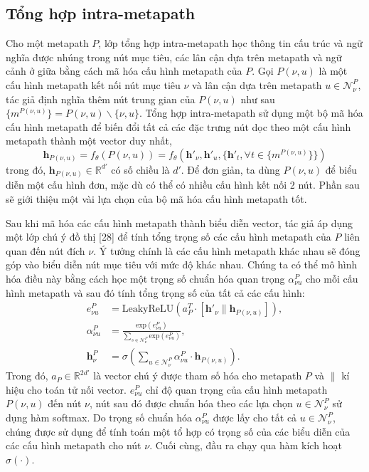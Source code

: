 \subsection{Tổng hợp intra-metapath}
Cho một metapath $P$, lớp tổng hợp intra-metapath học thông tin cấu trúc và ngữ nghĩa được nhúng trong nút mục tiêu, các lân cận dựa trên metapath và ngữ cảnh ở giữa bằng cách mã hóa cấu hình metapath của $P$. Gọi $P(\nu, u)$ là một cấu hình metapath kết nối nút mục tiêu $\nu$ và lân cận dựa trên metapath $u \in \pmb{\mathcal{N}}^P_{\nu}$, tác giả định nghĩa thêm  nút trung gian của $P(\nu, u)$ như sau $\{ m^{P(\nu, u)} \} = P(\nu, u) \backslash \{ \nu, u \}$. Tổng hợp intra-metapath sử dụng một bộ mã hóa cấu hình metapath để biến đổi tất cả các đặc trưng nút dọc theo một cấu hình metapath thành một vector duy nhất,
\begin{equation}
  \label{eq:02}
  \mathbf{h}_{P(\nu, u)} = f_{\theta} (P(\nu, u)) = f_{\theta} \left( \mathbf{h'}_{\nu}, \mathbf{h'}_{u}, \{ \mathbf{h'}_{t}, \forall t \in \{m^{P(\nu, u)}\} \} \right)
\end{equation}
trong đó, $\mathbf{h}_{P(\nu, u)} \in \mathbb{R}^{d'}$ có số chiều là $d'$. Để đơn giản, ta dùng $P(\nu, u)$ để biểu diễn một cấu hình đơn, mặc dù có thể có nhiều cấu hình kết nối 2 nút. Phần sau sẽ giới thiệu một vài lựa chọn của bộ mã hóa cấu hình metapath tốt.

Sau khi mã hóa các cấu hình metapath thành biểu diễn vector, tác giả áp dụng một lớp chú ý đồ thị [28] để  tính tổng trọng số các cấu hình metapath của $P$ liên quan đến nút đích $\nu$. Ý tưởng chính là các cấu hình metapath khác nhau sẽ đóng góp vào biểu diễn nút mục tiêu với mức độ khác nhau. Chúng ta có thể mô hình hóa điều này bằng cách học một trọng số chuẩn hóa quan trọng $\alpha^P_{\nu u}$ cho mỗi cấu hình metapath và sau đó tính tổng trọng số của tất cả các cấu hình:
\begin{equation}
  \label{eq:03}
  \begin{split}
    e^P_{\nu u} &= \text{LeakyReLU} (a^T_P \cdot [\mathbf{h'}_{\nu}\parallel \mathbf{h}_{P(\nu, u)}]), \\
  \alpha ^P_{\nu u} &= \frac{\text{exp}{(e^P_{\nu u})}}{\sum _{s \in \pmb{\mathcal{N}}^P_{\nu}} \text{exp} (e^P_{\nu u})}, \\
  \mathbf{h}^P_{\nu} &= \sigma \left( \sum_{u \in \pmb{\mathcal{N}}^P_{\nu}} \alpha ^P_{\nu u} \cdot \mathbf{h}_{P(\nu, u)} \right).
  \end{split}
\end{equation}
Trong đó, $a_P \in \mathbb{R}^{2d'}$ là vector chú ý được tham số hóa cho metapath $P$ và $\parallel$ kí hiệu cho toán tử nối vector. $e^P_{\nu u}$ chỉ độ quan trọng của cấu hình metapath $P(\nu, u)$ đến nút $\nu$, nút sau đó được chuẩn hóa theo các lựa chọn $u \in \pmb{\mathcal{N}}^P_{\nu}$ sử dụng hàm softmax. Do trọng số chuẩn hóa $\alpha ^P_{\nu u}$ được lấy cho tất cả $u \in \pmb{\mathcal{N}}^P_{\nu}$, chúng được sử dụng để tính toán một tổ hợp có trọng số của các biểu diễn của các cấu hình metapath cho nút $\nu$. Cuối cùng, đầu ra chạy qua hàm kích hoạt $\sigma (\cdot)$.

